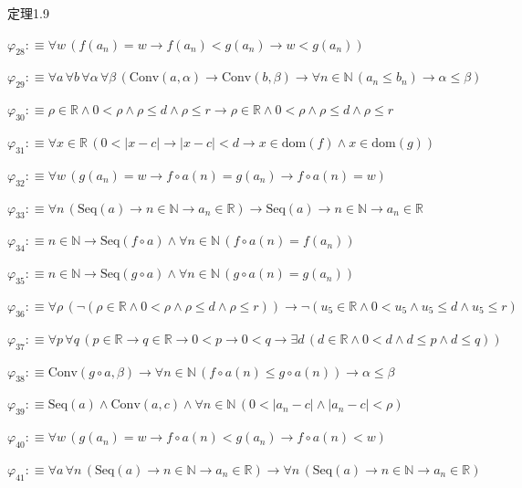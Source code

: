 \begin{fullproof}{定理1.9}
\begin{abbrevlist}
\item $\varphi_{28} :\equiv \forall w\,(f(a_{n}) = w \to f(a_{n}) < g(a_{n}) \to w < g(a_{n}))$
\item $\varphi_{29} :\equiv \forall a\,\forall b\,\forall \alpha\,\forall \beta\,(\mathrm{Conv}(a,\alpha) \to \mathrm{Conv}(b,\beta) \to \forall n \in \mathbb{N}\,(a_{n} \leq b_{n}) \to \alpha \leq \beta)$
\item $\varphi_{30} :\equiv \rho \in \mathbb{R} \land 0 < \rho \land \rho \leq d \land \rho \leq r \to \rho \in \mathbb{R} \land 0 < \rho \land \rho \leq d \land \rho \leq r$
\item $\varphi_{31} :\equiv \forall x \in \mathbb{R}\,(0 < \lvert x - c \rvert \to \lvert x - c \rvert < d \to x \in \mathrm{dom}(f) \land x \in \mathrm{dom}(g))$
\item $\varphi_{32} :\equiv \forall w\,(g(a_{n}) = w \to f \circ a(n) = g(a_{n}) \to f \circ a(n) = w)$
\item $\varphi_{33} :\equiv \forall n\,(\mathrm{Seq}(a) \to n \in \mathbb{N} \to a_{n} \in \mathbb{R}) \to \mathrm{Seq}(a) \to n \in \mathbb{N} \to a_{n} \in \mathbb{R}$
\item $\varphi_{34} :\equiv n \in \mathbb{N} \to \mathrm{Seq}(f \circ a) \land \forall n \in \mathbb{N}\,(f \circ a(n) = f(a_{n}))$
\item $\varphi_{35} :\equiv n \in \mathbb{N} \to \mathrm{Seq}(g \circ a) \land \forall n \in \mathbb{N}\,(g \circ a(n) = g(a_{n}))$
\item $\varphi_{36} :\equiv \forall \rho\,(\neg (\rho \in \mathbb{R} \land 0 < \rho \land \rho \leq d \land \rho \leq r)) \to \neg (u_{5} \in \mathbb{R} \land 0 < u_{5} \land u_{5} \leq d \land u_{5} \leq r)$
\item $\varphi_{37} :\equiv \forall p\,\forall q\,(p \in \mathbb{R} \to q \in \mathbb{R} \to 0 < p \to 0 < q \to \exists d\,(d \in \mathbb{R} \land 0 < d \land d \leq p \land d \leq q))$
\item $\varphi_{38} :\equiv \mathrm{Conv}(g \circ a,\beta) \to \forall n \in \mathbb{N}\,(f \circ a(n) \leq g \circ a(n)) \to \alpha \leq \beta$
\item $\varphi_{39} :\equiv \mathrm{Seq}(a) \land \mathrm{Conv}(a,c) \land \forall n \in \mathbb{N}\,(0 < \lvert a_{n} - c \rvert \land \lvert a_{n} - c \rvert < \rho)$
\item $\varphi_{40} :\equiv \forall w\,(g(a_{n}) = w \to f \circ a(n) < g(a_{n}) \to f \circ a(n) < w)$
\item $\varphi_{41} :\equiv \forall a\,\forall n\,(\mathrm{Seq}(a) \to n \in \mathbb{N} \to a_{n} \in \mathbb{R}) \to \forall n\,(\mathrm{Seq}(a) \to n \in \mathbb{N} \to a_{n} \in \mathbb{R})$

\end{abbrevlist}
\end{fullproof}
